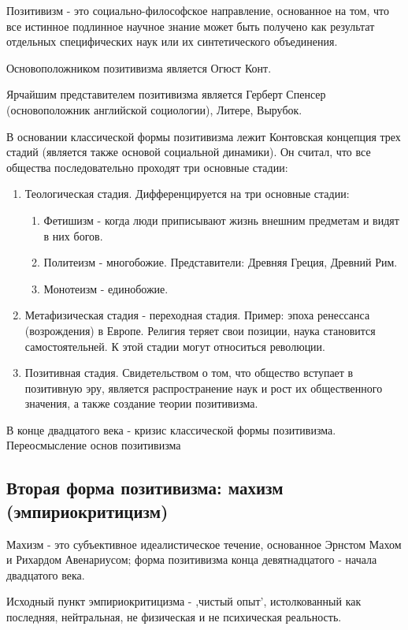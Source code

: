 \documentclass{article}
\begin{document}
Позитивизм - это социально-философское направление, основанное на том, что все истинное подлинное научное знание может быть получено как результат отдельных специфических наук или их синтетического объединения.

Основоположником позитивизма является Огюст Конт.

Ярчайшим представителем позитивизма является Герберт Спенсер (основоположник английской социологии), Литере, Вырубок.

В основании классической формы позитивизма лежит Контовская концепция трех стадий (является также основой социальной динамики). Он считал, что все общества последовательно проходят три основные стадии:

\begin{enumerate}
    \item Теологическая стадия. Дифференцируется на три основные стадии:
    \begin{enumerate}
        \item Фетишизм - когда люди приписывают жизнь внешним предметам и видят в них богов.
        \item Политеизм - многобожие. Представители: Древняя Греция, Древний Рим.
        \item Монотеизм - единобожие.
    \end{enumerate}
    \item Метафизическая стадия - переходная стадия. Пример: эпоха ренессанса (возрождения) в Европе. Религия теряет свои позиции, наука становится самостоятельней. К этой стадии могут относиться революции.
    \item Позитивная стадия. Свидетельством о том, что общество вступает в позитивную эру, является распространение наук и рост их общественного значения, а также создание теории позитивизма.
\end{enumerate}

В конце двадцатого века - кризис классической формы позитивизма. Переосмысление основ позитивизма

\subsection{Вторая форма позитивизма: махизм (эмпириокритицизм)}

Махизм - это субъективное идеалистическое течение, основанное Эрнстом Махом и Рихардом Авенариусом; форма позитивизма конца девятнадцатого - начала двадцатого века.

Исходный пункт эмпириокритицизма - ,чистый опыт', истолкованный как последняя, нейтральная, не физическая и не психическая реальность.
\end{document}
